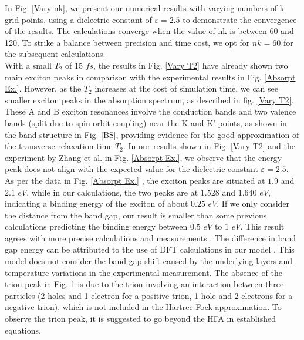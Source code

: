 \documentclass[12pt,english,a4paper]{article}
\begin{document}
\quad In Fig. \ref{Vary nk}, we present our numerical results with varying numbers of k-grid points, using a dielectric constant of $\varepsilon = 2.5$ to demonstrate the convergence of the results. The calculations converge when the value of nk is between 60 and 120. To strike a balance between precision and time cost, we opt for $nk = 60$ for the subsequent calculations.\\\null
\quad With a small $T_2$ of 15 \(fs\), the results in Fig. \ref{Vary T2} have already shown two main exciton peaks in comparison with the experimental results in Fig. \ref{Absorpt Ex.}. However, as the $T_2$ increases at the cost of simulation time, we can see smaller exciton peaks in the absorption spectrum, as described in fig. \ref{Vary T2}. These A and B exciton resonances involve the conduction bands and two valence bands (split due to spin-orbit coupling) near the K and $\mathrm{K}$' points, as shown in the band structure in Fig. \ref{BS}, providing evidence for the good approximation of the transverse relaxation time $T_2$. In our results shown in Fig. \ref{Vary T2} and the experiment by Zhang et al. \cite{zhang_absorption_2014} in Fig. \ref{Absorpt Ex.}, we observe that the energy peak does not align with the expected value for the dielectric constant $\varepsilon = 2.5$. As per the data in Fig. \ref{Absorpt Ex.} \cite{zhang_absorption_2014}, the exciton peaks are situated at $1.9$ and $2.1$ \(eV\), while in our calculations, the two peaks are at $1.528$ and $1.640$ \(eV\), indicating a binding energy of the exciton of about $0.25$ \(eV\). If we only consider the distance from the band gap, our result is smaller than some previous calculations predicting the binding energy between $0.5$ \(eV\) to $1 $ \(eV\)\cite{ramasubramaniam_large_2012,qiu_optical_2013,cheiwchanchamnangij_quasiparticle_2012, shi_quasiparticle_2013}. This result agrees with more precise calculations and measurements \cite{zhang_absorption_2014, kirichenko_influence_2021, zhang_direct_2014}. The difference in band gap energy can be attributed to the use of DFT calculations in our model \cite{liu_three-band_2013}. This model does not consider the band gap shift caused by the underlying layers and temperature variations in the experimental measurement. The absence of the trion peak in Fig. 1 is due to the trion involving an interaction between three particles (2 holes and 1 electron for a positive trion, 1 hole and 2 electrons for a negative trion), which is not included in the Hartree-Fock approximation. To observe the trion peak, it is suggested to go beyond the HFA in established equations.\\
\end{document}
